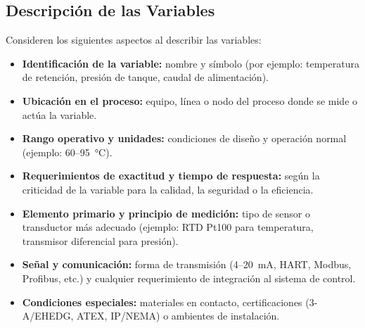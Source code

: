 \documentclass[12pt,letterpaper]{report}
\begin{document}
	\subsection{Descripción de las Variables}
	Consideren los siguientes aspectos al describir las variables:
	
	\begin{itemize}
		\item \textbf{Identificación de la variable:} nombre y símbolo (por ejemplo: temperatura de retención, presión de tanque, caudal de alimentación).
		\item \textbf{Ubicación en el proceso:} equipo, línea o nodo del proceso donde se mide o actúa la variable.
		\item \textbf{Rango operativo y unidades:} condiciones de diseño y operación normal (ejemplo: 60--95~\si{\celsius}).
		\item \textbf{Requerimientos de exactitud y tiempo de respuesta:} según la criticidad de la variable para la calidad, la seguridad o la eficiencia.
		\item \textbf{Elemento primario y principio de medición:} tipo de sensor o transductor más adecuado (ejemplo: RTD Pt100 para temperatura, transmisor diferencial para presión).
		\item \textbf{Señal y comunicación:} forma de transmisión (4--20~mA, HART, Modbus, Profibus, etc.) y cualquier requerimiento de integración al sistema de control.
		\item \textbf{Condiciones especiales:} materiales en contacto, certificaciones (3-A/EHEDG, ATEX, IP/NEMA) o ambientes de instalación.
	\end{itemize}
\end{document}
